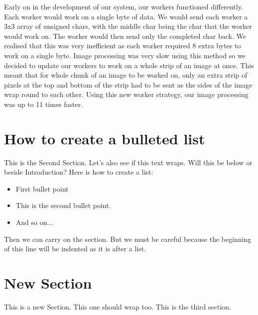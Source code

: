 \documentclass{article}
\begin{document}
\begin{multicols}{2}
\vspace{5mm}

Early on in the development of our system, our workers functioned differently. Each worker would work
on a single byte of data. We would send each worker a 3x3 array of unsigned chars, with the middle 
char being the char that the worker would work on. The worker would then send only the completed
char back. We realised that this was very inefficient as each worker required 8 extra bytes to work
on a single byte. Image processing was very slow using this method so we decided to update
our workers to work on a whole strip of an image at once. This meant that for whole chunk of an image
to be worked on, only an extra strip of pixels at the top and bottom of the strip had to be sent as
the sides of the image wrap round to each other. Using this new worker strategy, our image processing
was up to 11 times faster.

\vspace{5mm}

\section{How to create a bulleted list}
This is the Second Section. Let's also see if this text wraps. Will this be below or beside Introduction? Here is how to create a list:

\begin{itemize}
\item First bullet point
\item This is the second bullet point.
\item And so on...
\end{itemize}

Then we can carry on the section. But we must be careful because the beginning of this line will be indented as it is after a list.

\columnbreak

\section{New Section}
This is a new Section. This one should wrap too. This is the third section.

\end{multicols}

\end{document}
